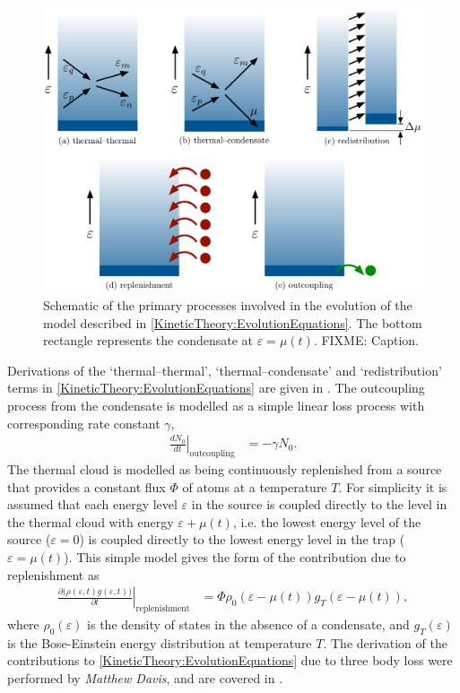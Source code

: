 \begin{figure}
    \centering
    \includegraphics[width=14cm]{ProcessDiagrams}
    \caption{Schematic of the primary processes involved in the evolution of the model described in \eqref{KineticTheory:EvolutionEquations}. The bottom rectangle represents the condensate at $\varepsilon = \mu(t)$. FIXME: Caption.}
    \label{KineticTheory:ProcessDiagrams}
\end{figure}

Derivations of the `thermal--thermal', `thermal--condensate' and `redistribution' terms in \eqref{KineticTheory:EvolutionEquations} are given in \citep{Bijlsma:2000}. The outcoupling process from the condensate is modelled as a simple linear loss process with corresponding rate constant $\gamma$,
\begin{align}
    \left.\frac{d N_0}{d t}\right|_\text{outcoupling} &= - \gamma N_0.
\end{align}
The thermal cloud is modelled as being continuously replenished from a source that provides a constant flux $\Phi$ of atoms at a temperature $T$. For simplicity it is assumed that each energy level $\varepsilon$ in the source is coupled directly to the level in the thermal cloud with energy $\varepsilon + \mu(t)$, i.e. the lowest energy level of the source ($\varepsilon=0$) is coupled directly to the lowest energy level in the trap ($\varepsilon = \mu(t)$). This simple model gives the form of the contribution due to replenishment as
\begin{align}
    \left. \frac{\partial \big(\rho(\varepsilon, t) g(\varepsilon, t))}{\partial t} \right|_\text{replenishment} &= \Phi \rho_0(\varepsilon - \mu(t)) g_T(\varepsilon - \mu(t)),
\end{align}
where $\rho_0(\varepsilon)$ is the density of states in the absence of a condensate, and $g_T(\varepsilon)$ is the Bose-Einstein energy distribution at temperature $T$. The derivation of the contributions to \eqref{KineticTheory:EvolutionEquations} due to three body loss were performed by \emph{Matthew Davis}, and are covered in .

